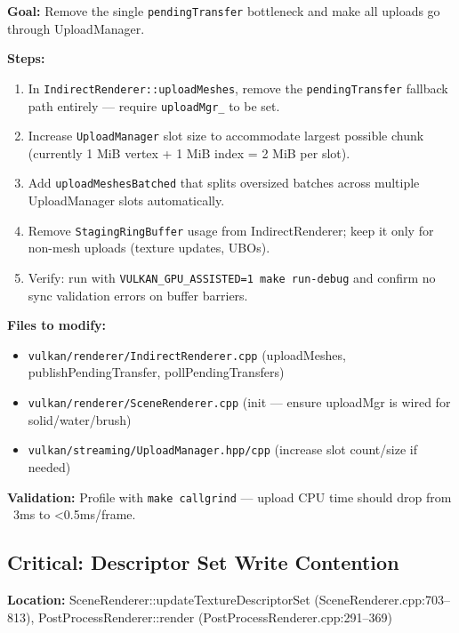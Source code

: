 \documentclass[11pt,a4paper]{article}
\begin{document}
\begin{tcolorbox}[promptbox={Prompt: Eliminate Staging Buffer Serialization}]
\textbf{Goal:} Remove the single \texttt{pendingTransfer} bottleneck and make all uploads go through UploadManager.

\textbf{Steps:}
\begin{enumerate}
    \item In \texttt{IndirectRenderer::uploadMeshes}, remove the \texttt{pendingTransfer} fallback path entirely — require \texttt{uploadMgr\_} to be set.
    \item Increase \texttt{UploadManager} slot size to accommodate largest possible chunk (currently 1 MiB vertex + 1 MiB index = 2 MiB per slot).
    \item Add \texttt{uploadMeshesBatched} that splits oversized batches across multiple UploadManager slots automatically.
    \item Remove \texttt{StagingRingBuffer} usage from IndirectRenderer; keep it only for non-mesh uploads (texture updates, UBOs).
    \item Verify: run with \texttt{VULKAN\_GPU\_ASSISTED=1 make run-debug} and confirm no sync validation errors on buffer barriers.
\end{enumerate}

\textbf{Files to modify:}
\begin{itemize}
    \item \texttt{vulkan/renderer/IndirectRenderer.cpp} (uploadMeshes, publishPendingTransfer, pollPendingTransfers)
    \item \texttt{vulkan/renderer/SceneRenderer.cpp} (init — ensure uploadMgr is wired for solid/water/brush)
    \item \texttt{vulkan/streaming/UploadManager.hpp/cpp} (increase slot count/size if needed)
\end{itemize}

\textbf{Validation:} Profile with \texttt{make callgrind} — upload CPU time should drop from ~3ms to <0.5ms/frame.
\end{tcolorbox}

\subsection{Critical: Descriptor Set Write Contention}
\textbf{Location:} SceneRenderer::updateTextureDescriptorSet (SceneRenderer.cpp:703–813), PostProcessRenderer::render (PostProcessRenderer.cpp:291–369)
\end{document}
